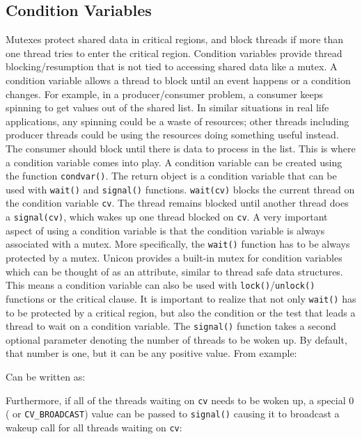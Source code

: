 \subsection{Condition Variables}
Mutexes protect shared data in critical regions, and block threads if more
than one thread tries to enter the critical region. Condition variables
provide thread blocking/resumption that is not tied to accessing shared
data like a mutex. A condition variable allows a thread to block until an
event happens or a condition changes. For example, in a producer/consumer
problem, a consumer keeps spinning to get values out of the shared list. In
similar situations in real life applications, any spinning could be a waste
of resources; other threads including producer threads could be using the
resources doing something useful instead. The consumer should block until
there is data to process in the list. This is where a condition variable
comes into play.  A condition variable can be created using the function
\texttt{condvar()}.  The return object is a condition variable that can be
used with \texttt{wait()} and \texttt{signal()}
functions. \texttt{wait(cv)} blocks the current thread on the condition
variable \texttt{cv}. The thread remains blocked until another thread does
a \texttt{signal(cv)}, which wakes up one thread blocked on \texttt{cv}. A
very important aspect of using a condition variable is that the condition
variable is always associated with a mutex. More specifically, the
\texttt{wait()} function has to be always protected by a mutex.  Unicon
provides a built-in mutex for condition variables which can be thought of
as an attribute, similar to thread safe data structures. This means a
condition variable can also be used with \texttt{lock()}/\texttt{unlock()}
functions or the critical clause. It is important to realize that not only
\texttt{wait()} has to be protected by a critical region, but also the
condition or the test that leads a thread to wait on a condition
variable. The \texttt{signal()} function takes a second optional parameter
denoting the number of threads to be woken up.  By default, that number is
one, but it can be any positive value. From example:


\noindent
Can be written as:


\noindent
Furthermore, if all of the threads waiting on \texttt{cv} needs to be woken
up, a special 0 ( or \texttt{CV\_BROADCAST}) value can be passed to
\texttt{signal()} causing it to broadcast a wakeup call for all threads
waiting on \texttt{cv}:

